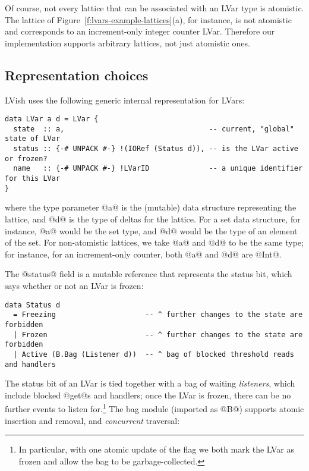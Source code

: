 Of course, not every lattice that can be associated with an LVar type
is atomistic.  The lattice of
Figure~\ref{f:lvars-example-lattices}(a), for instance, is not
atomistic and corresponds to an increment-only integer counter LVar.
Therefore our implementation supports arbitrary lattices, not just
atomistic ones.

\subsection{Representation choices}


LVish uses the following generic internal representation for LVars:

\singlespacing
\begin{lstlisting}
data LVar a d = LVar {
  state  :: a,                                  -- current, "global" state of LVar
  status :: {-# UNPACK #-} !(IORef (Status d)), -- is the LVar active or frozen?
  name   :: {-# UNPACK #-} !LVarID              -- a unique identifier for this LVar
}
\end{lstlisting}
\doublespacing

\noindent where the type parameter @a@ is the (mutable) data structure
representing the lattice, and @d@ is the type of deltas for the
lattice.  For a set data structure, for instance, @a@ would be the set
type, and @d@ would be the type of an element of the set.  For
non-atomistic lattices, we take @a@ and @d@ to be the same type; for
instance, for an increment-only counter, both @a@ and @d@ are @Int@.

The @status@ field is a mutable reference that represents the status
bit, which says whether or not an LVar is frozen:

\singlespacing
\begin{lstlisting}
data Status d 
  = Freezing                     -- ^ further changes to the state are forbidden
  | Frozen                       -- ^ further changes to the state are forbidden
  | Active (B.Bag (Listener d))  -- ^ bag of blocked threshold reads and handlers
\end{lstlisting}
\doublespacing

The status bit of an LVar is tied together with a bag of waiting
\emph{listeners}, which include blocked @get@s and handlers; once the
LVar is frozen, there can be no further events to listen
for.\footnote{In particular, with one atomic update of the flag we
  both mark the LVar as frozen and allow the bag to be
  garbage-collected.}  The bag module (imported as @B@) supports
atomic insertion and removal, and \emph{concurrent} traversal:

